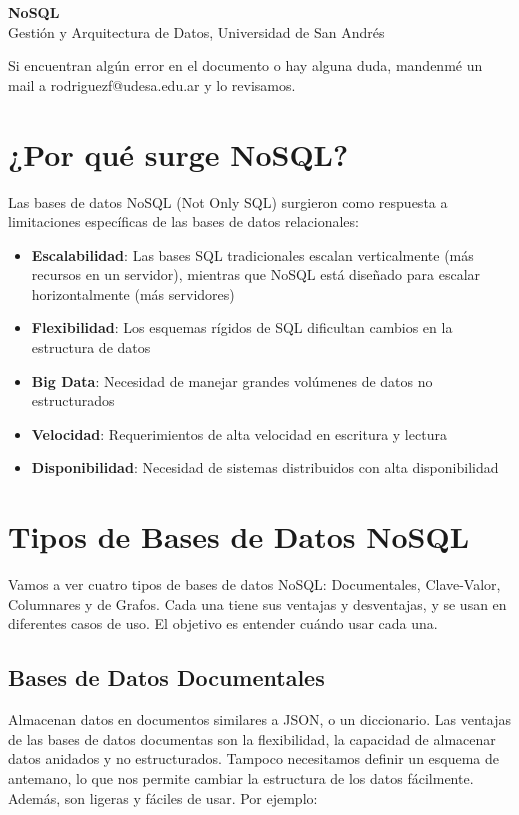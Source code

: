 \documentclass[12pt]{article}
\begin{document}
\begin{center}
  {\LARGE \textbf{NoSQL}}\\[0.5em]
  {Gestión y Arquitectura de Datos, Universidad de San Andrés}
\end{center}

Si encuentran algún error en el documento o hay alguna duda, mandenmé un mail a rodriguezf@udesa.edu.ar y lo revisamos.

\section{¿Por qué surge NoSQL?}
Las bases de datos NoSQL (Not Only SQL) surgieron como respuesta a limitaciones específicas de las bases de datos relacionales:

\begin{itemize}
    \item \textbf{Escalabilidad}: Las bases SQL tradicionales escalan verticalmente (más recursos en un servidor), mientras que NoSQL está diseñado para escalar horizontalmente (más servidores)
    \item \textbf{Flexibilidad}: Los esquemas rígidos de SQL dificultan cambios en la estructura de datos
    \item \textbf{Big Data}: Necesidad de manejar grandes volúmenes de datos no estructurados
    \item \textbf{Velocidad}: Requerimientos de alta velocidad en escritura y lectura
    \item \textbf{Disponibilidad}: Necesidad de sistemas distribuidos con alta disponibilidad
\end{itemize}

\section{Tipos de Bases de Datos NoSQL}

Vamos a ver cuatro tipos de bases de datos NoSQL: Documentales, Clave-Valor, Columnares y de Grafos. Cada una tiene sus ventajas y desventajas, y se usan en diferentes casos de uso. El objetivo es entender cuándo usar cada una.

\subsection{Bases de Datos Documentales}

Almacenan datos en documentos similares a JSON, o un diccionario. Las ventajas de las bases de datos documentas son la flexibilidad, la capacidad de almacenar datos anidados y no estructurados. Tampoco necesitamos definir un esquema de antemano, lo que nos permite cambiar la estructura de los datos fácilmente. Además, son ligeras y fáciles de usar. Por ejemplo:
\end{document}
